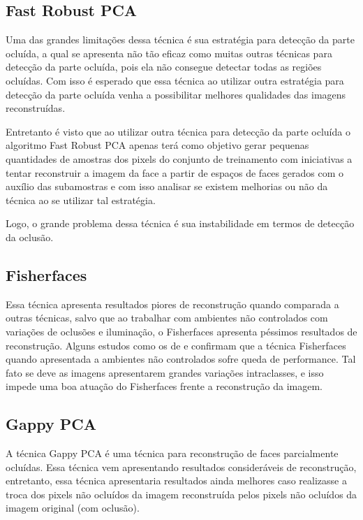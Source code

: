 \subsection{Fast Robust PCA}

Uma das grandes limitações dessa técnica é sua estratégia para detecção da parte ocluída, a qual se apresenta não tão eficaz como muitas outras técnicas para detecção da parte ocluída, pois ela não consegue detectar todas as regiões ocluídas. Com isso é esperado que essa técnica ao utilizar outra estratégia para detecção da parte ocluída venha a possibilitar melhores qualidades das imagens reconstruídas.

Entretanto é visto que ao utilizar outra técnica para detecção da parte ocluída o algoritmo Fast Robust PCA apenas terá como objetivo gerar pequenas quantidades de amostras dos pixels do conjunto de treinamento com iniciativas a tentar reconstruir a imagem da face a partir de espaços de faces gerados com o auxílio das subamostras e com isso analisar se existem melhorias ou não da técnica ao se utilizar tal estratégia.

Logo, o grande problema dessa técnica é sua instabilidade em termos de detecção da oclusão.


\subsection{Fisherfaces}

Essa técnica apresenta resultados piores de reconstrução quando comparada a outras técnicas, salvo que ao trabalhar com ambientes não controlados com variações de oclusões e iluminação, o Fisherfaces apresenta péssimos resultados de reconstrução. Alguns estudos como os de  e  confirmam que a técnica Fisherfaces quando apresentada a ambientes não controlados sofre queda de performance. Tal fato se deve as imagens apresentarem grandes variações intraclasses, e isso impede uma boa atuação do Fisherfaces frente a reconstrução da imagem.


\subsection{Gappy PCA}

A técnica Gappy PCA é uma técnica para reconstrução de faces parcialmente ocluídas. Essa técnica vem apresentando resultados consideráveis de reconstrução, entretanto, essa técnica apresentaria resultados ainda melhores  caso realizasse a troca dos pixels não ocluídos da imagem reconstruída pelos pixels não ocluídos da imagem original (com oclusão).

